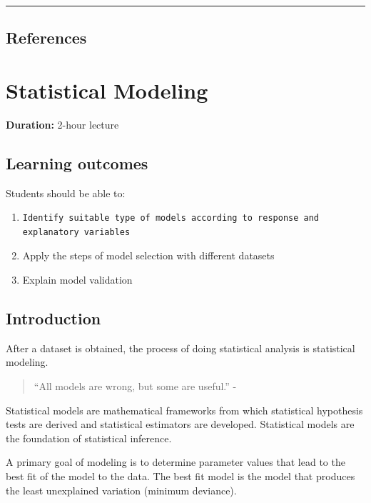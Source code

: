 \documentclass[
]{book}
\begin{document}
\begin{center}\rule{0.5\linewidth}{0.5pt}\end{center}

\section{References}\label{references-7}

\chapter{Statistical Modeling}\label{statistical-modeling}

\textbf{Duration:} 2-hour lecture

\section{Learning outcomes}\label{learning-outcomes-8}

Students should be able to:

\begin{enumerate}
\def\labelenumi{\arabic{enumi}.}
\item
\begin{verbatim}
Identify suitable type of models according to response and explanatory variables
\end{verbatim}
\item
  Apply the steps of model selection with different datasets
\item
  Explain model validation
\end{enumerate}

\section{Introduction}\label{introduction-8}

After a dataset is obtained, the process of doing statistical analysis is statistical modeling.

\begin{quote}
``All models are wrong, but some are useful.'' - \citet{Box1976}
\end{quote}

Statistical models are mathematical frameworks from which statistical hypothesis tests are derived and statistical estimators are developed. Statistical models are the foundation of statistical inference.

A primary goal of modeling is to determine parameter values that lead to the best fit of the model to the data. The best fit model is the model that produces the least unexplained variation (minimum deviance).
\end{document}
